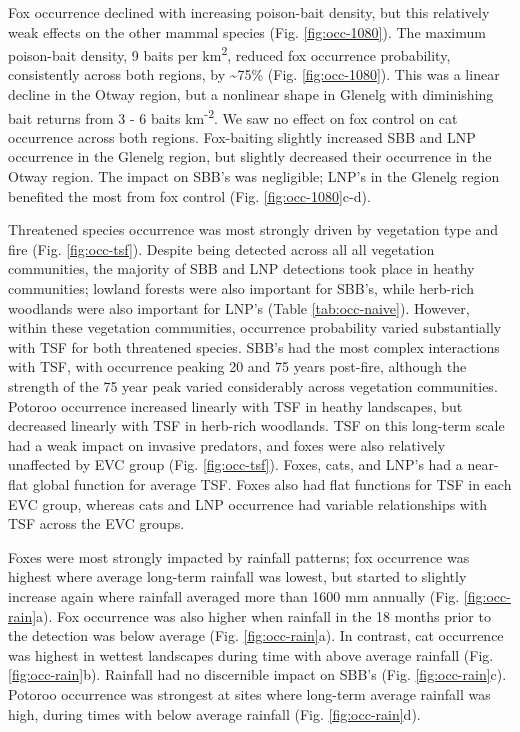 \documentclass[11pt,a4paper,titlepage,twoside,openright]{style/unimelbthesis}
\begin{document}
\begin{mainmatter}
Fox occurrence declined with increasing poison-bait density, but this relatively weak effects on the other mammal species (Fig. \ref{fig:occ-1080}). The maximum poison-bait density, 9 baits per km\textsuperscript{2}, reduced fox occurrence probability, consistently across both regions, by \textasciitilde75\% (Fig. \ref{fig:occ-1080}). This was a linear decline in the Otway region, but a nonlinear shape in Glenelg with diminishing bait returns from 3 - 6 baits km\textsuperscript{-2}. We saw no effect on fox control on cat occurrence across both regions. Fox-baiting slightly increased SBB and LNP occurrence in the Glenelg region, but slightly decreased their occurrence in the Otway region. The impact on SBB's was negligible; LNP's in the Glenelg region benefited the most from fox control (Fig. \ref{fig:occ-1080}c-d).

Threatened species occurrence was most strongly driven by vegetation type and fire (Fig. \ref{fig:occ-tsf}). Despite being detected across all all vegetation communities, the majority of SBB and LNP detections took place in heathy communities; lowland forests were also important for SBB's, while herb-rich woodlands were also important for LNP's (Table \ref{tab:occ-naive}). However, within these vegetation communities, occurrence probability varied substantially with TSF for both threatened species. SBB's had the most complex interactions with TSF, with occurrence peaking 20 and 75 years post-fire, although the strength of the 75 year peak varied considerably across vegetation communities. Potoroo occurrence increased linearly with TSF in heathy landscapes, but decreased linearly with TSF in herb-rich woodlands. TSF on this long-term scale had a weak impact on invasive predators, and foxes were also relatively unaffected by EVC group (Fig. \ref{fig:occ-tsf}). Foxes, cats, and LNP's had a near-flat global function for average TSF. Foxes also had flat functions for TSF in each EVC group, whereas cats and LNP occurrence had variable relationships with TSF across the EVC groups.

Foxes were most strongly impacted by rainfall patterns; fox occurrence was highest where average long-term rainfall was lowest, but started to slightly increase again where rainfall averaged more than 1600 mm annually (Fig. \ref{fig:occ-rain}a). Fox occurrence was also higher when rainfall in the 18 months prior to the detection was below average (Fig. \ref{fig:occ-rain}a). In contrast, cat occurrence was highest in wettest landscapes during time with above average rainfall (Fig. \ref{fig:occ-rain}b). Rainfall had no discernible impact on SBB's (Fig. \ref{fig:occ-rain}c). Potoroo occurrence was strongest at sites where long-term average rainfall was high, during times with below average rainfall (Fig. \ref{fig:occ-rain}d).


\end{mainmatter}
\end{document}
